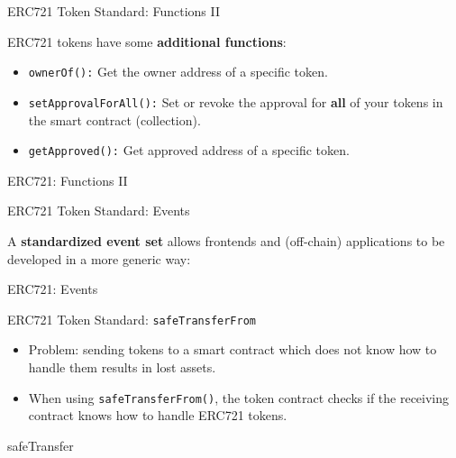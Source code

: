 \documentclass[handout]{beamer}
\begin{document}
\begin{frame}{ERC721 Token Standard: Functions II}

ERC721 tokens have some \textbf{additional functions}:

\begin{itemize}
	\item<2-> \texttt{ownerOf():} {Get the owner address of a specific token.}
	\item<3-> \texttt{setApprovalForAll():} {Set or revoke the approval for \textbf{all} of your tokens in the smart contract (collection).}
	\item<4-> \texttt{getApproved():} {Get approved address of a specific token.}	
\end{itemize}

\vspace{1em}
	\begin{samplecode}{ERC721: Functions II}
		
	\end{samplecode}
\end{frame}

\begin{frame}{ERC721 Token Standard: Events}

	A \textbf{standardized event set} allows frontends and (off-chain) applications to be developed in a more generic way:
\vspace{1em}
	\begin{samplecode}{ERC721: Events}
		
	\end{samplecode}
\end{frame}

\begin{frame}{ERC721 Token Standard: \texttt{safeTransferFrom}}

\begin{itemize}
	\item Problem: sending tokens to a smart contract which does not know how to handle them results in lost assets.
	\item When using \texttt{safeTransferFrom()}, the token contract checks if the receiving contract knows how to handle ERC721 tokens. 
\end{itemize}
\vspace{1em}
	\begin{samplecode}{safeTransfer}
		
	\end{samplecode}
\end{frame}
\end{document}
